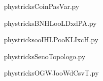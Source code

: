     

    \clearpage
    


    \newcommand{\CaptionFigCoinPasVar}{<+Type your caption here+>}
    \begin{center}
        
    \end{center}
    phystricksCoinPasVar.py

    

    \clearpage
    


    \newcommand{\CaptionFigBNHLooLDxdPA}{<+Type your caption here+>}
    \begin{center}
        
    \end{center}
    phystricksBNHLooLDxdPA.py

    

    \clearpage
    


    \newcommand{\CaptionFigooIHLPooKLIxcH}{<+Type your caption here+>}
    \begin{center}
        
    \end{center}
    phystricksooIHLPooKLIxcH.py

    

    \clearpage
    


    \newcommand{\CaptionFigSenoTopologo}{<+Type your caption here+>}
    \begin{center}
        
    \end{center}
    phystricksSenoTopologo.py

    

    \clearpage
    


    \newcommand{\CaptionFigOGWJooWdCsvT}{<+Type your caption here+>}
    \begin{center}
        
    \end{center}
    phystricksOGWJooWdCsvT.py

    

    \clearpage
    


